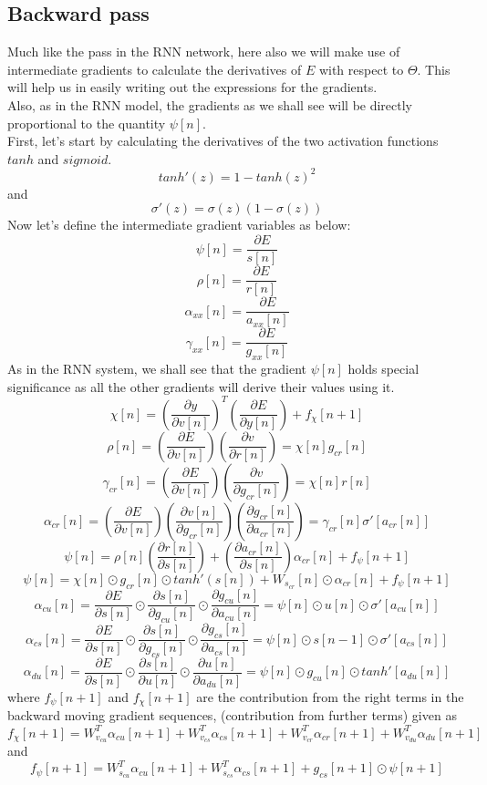 \documentclass[12pt,letterpaper]{article}
\begin{document}
\subsection{Backward pass}
Much like the pass in the RNN network, here also we will make use of intermediate gradients to calculate the derivatives of $E$ with respect to $\Theta$. This will help us in easily writing out the expressions for the gradients. 
\\
Also, as in the RNN model, the gradients as we shall see will be directly proportional to the quantity $\psi[n]$.
\\
First, let's start by calculating the derivatives of the two activation functions $tanh$ and $sigmoid$.
\[
tanh'(z) = 1-tanh(z)^2\tag{47}
\]
and \[
\sigma'(z) = \sigma(z)(1-\sigma(z))\tag{48}
\]
Now let's define the intermediate gradient variables as below:
\[
\psi[n] = \frac{\partial{E}}{s[n]} \tag{49}
\]
\[
\rho[n] = \frac{\partial{E}}{r[n]} \tag{50}
\]
\[
\alpha_{xx}[n] = \frac{\partial{E}}{a_{xx}[n]} \tag{51}
\]
\[
\gamma_{xx}[n] = \frac{\partial{E}}{g_{xx}[n]}\tag{52}
\]
As in the RNN system, we shall see that the gradient $\psi[n]$ holds special significance as all the other gradients will derive their values using it.
\[
\chi[n] = (\frac{\partial{y}}{\partial{v[n]}})^{T}(\frac{\partial{E}}{\partial{y[n]}}) + f_{\chi}[n+1]\tag{53}
\]
\[
\rho[n] = (\frac{\partial{E}}{\partial{v[n]}})(\frac{\partial{v}}{\partial{r[n]}}) = \chi[n]g_{cr}[n] \tag{54}
\]
\[
\gamma_{cr}[n] = (\frac{\partial{E}}{\partial{v[n]}})(\frac{\partial{v}}{\partial{g_{cr}[n]}}) = \chi[n]r[n] \tag{55}
\]
\[
\alpha_{cr}[n] = (\frac{\partial{E}}{\partial{v[n]}})(\frac{\partial{v[n]}}{\partial{g_{cr}[n]}})(\frac{\partial{g_{cr}[n]}}{\partial{a_{cr}[n]}}) = \gamma_{cr}[n]\sigma'[a_{cr}[n]] \tag{56}
\]
\[
\psi[n] = \rho[n](\frac{\partial{r[n]}}{\partial{s[n]}}) + 
(\frac{\partial{a_{cr}[n]}}{\partial{s[n]}})\alpha_{cr}[n]
+f_{\psi}[n+1]\tag{57}
\]
\[
\psi[n] = \chi[n]\odot g_{cr}[n]\odot tanh'(s[n]) + W_{s_{cr}}[n]\odot \alpha_{cr}[n] + f_{\psi}[n+1] \tag{58}
\]
\[
\alpha_{cu}[n] = \frac{\partial{E}}{\partial{s[n]}}\odot \frac{\partial{s[n]}}{\partial{g_{cu}[n]}}\odot \frac{\partial{g_{cu}[n]}}{\partial{a_{cu}[n]}} = 
\psi[n]\odot u[n]\odot \sigma'[a_{cu}[n]] \tag{59}
\]
\[
\alpha_{cs}[n] = \frac{\partial{E}}{\partial{s[n]}}\odot \frac{\partial{s[n]}}{\partial{g_{cs}[n]}}\odot \frac{\partial{g_{cs}[n]}}{\partial{a_{cs}[n]}} = 
\psi[n]\odot s[n-1]\odot \sigma'[a_{cs}[n]] \tag{60}
\]
\[
\alpha_{du}[n] = \frac{\partial{E}}{\partial{s[n]}}\odot \frac{\partial{s[n]}}{\partial{u[n]}}\odot \frac{\partial{u[n]}}{\partial{a_{du}[n]}} = 
\psi[n]\odot g_{cu}[n]\odot tanh'[a_{du}[n]] \tag{61}
\]
where $f_{\psi}[n+1]$ and $f_{\chi}[n+1]$ are the contribution from the right terms in the backward moving gradient sequences, (contribution from further terms) given as \\
\[
f_{\chi}[n+1] = W_{v_{cu}}^{T}\alpha_{cu}[n+1]+ W_{v_{cs}}^{T}\alpha_{cs}[n+1]+W_{v_{cr}}^{T}\alpha_{cr}[n+1]+
W_{v_{du}}^{T}\alpha_{du}[n+1]\tag{62}
\]
and
\[
f_{\psi}[n+1] = W_{s_{cu}}^{T}\alpha_{cu}[n+1]+ W_{s_{cs}}^{T}\alpha_{cs}[n+1]+g_{cs}[n+1]\odot\psi[n+1]\tag{63}
\]
\end{document}
